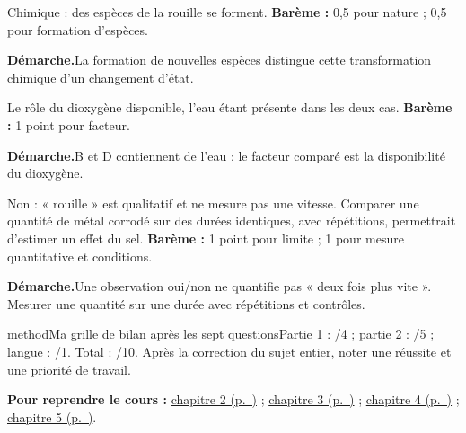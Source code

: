 \label{cor-bb-5}
\par\noindent\begin{minipage}{\linewidth}
Chimique : des espèces de la rouille se forment. \textbf{Barème :} 0,5 pour nature ; 0,5 pour formation d’espèces.\par
\smallskip\noindent\textbf{Démarche.}\enspace La formation de nouvelles espèces distingue cette transformation chimique d’un changement d’état.\par
\end{minipage}\par
\par\noindent\begin{minipage}{\linewidth}
Le rôle du dioxygène disponible, l’eau étant présente dans les deux cas. \textbf{Barème :} 1 point pour facteur.\par
\smallskip\noindent\textbf{Démarche.}\enspace B et D contiennent de l’eau ; le facteur comparé est la disponibilité du dioxygène.\par
\end{minipage}\par
\par\noindent\begin{minipage}{\linewidth}
Non : « rouille » est qualitatif et ne mesure pas une vitesse. Comparer une quantité de métal corrodé sur des durées identiques, avec répétitions, permettrait d’estimer un effet du sel. \textbf{Barème :} 1 point pour limite ; 1 pour mesure quantitative et conditions.\par
\smallskip\noindent\textbf{Démarche.}\enspace Une observation oui/non ne quantifie pas « deux fois plus vite ». Mesurer une quantité sur une durée avec répétitions et contrôles.\par
{}
\end{minipage}\par
\par\noindent\begin{minipage}{\linewidth}
\begin{pcEncadre}{method}{Ma grille de bilan après les sept questions}Partie 1 : /4 ; partie 2 : /5 ; langue : /1. Total : /10. Après la correction du sujet entier, noter une réussite et une priorité de travail.\end{pcEncadre}
{\small\textbf{Pour reprendre le cours : }\hyperref[chap-2]{chapitre 2 (p.~\pageref*{chap-2})} ; \hyperref[chap-3]{chapitre 3 (p.~\pageref*{chap-3})} ; \hyperref[chap-4]{chapitre 4 (p.~\pageref*{chap-4})} ; \hyperref[chap-5]{chapitre 5 (p.~\pageref*{chap-5})}.\par}\end{minipage}\par
